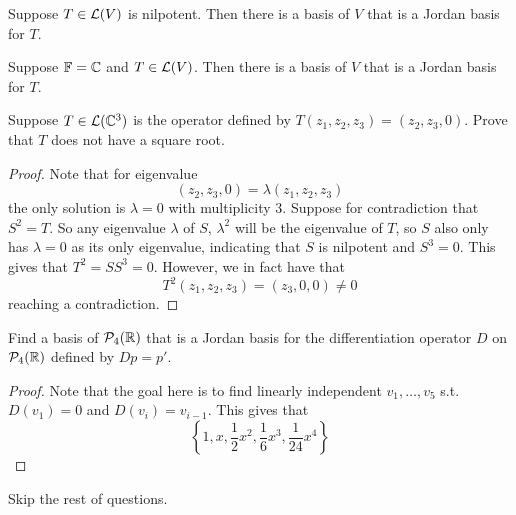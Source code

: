 \documentclass{extarticle}
\begin{document}
\begin{thm}
    Suppose \(T \in \mathcal{L}(V)\) is nilpotent. Then there is a basis of \(V\) that is a Jordan basis for \(T\).
\end{thm}


\begin{corollary}
    Suppose \(\mathbb{F} = \mathbb{C}\) and \(T \in \mathcal{L}(V)\). Then there is a basis of \(V\) that is a Jordan basis for 
    \(T\). 
\end{corollary}


\newpage 
{}

\begin{problem}{1}
    Suppose \(T \in \mathcal{L}(\mathbb{C}^3)\) is the operator defined by \(T(z_1, z_2, z_3) = (z_2, z_3, 0)\). Prove that 
    \(T\) does not have a square root. 
\end{problem}

\begin{proof}
Note that for eigenvalue 
\[(z_2, z_3, 0) = \lambda(z_1, z_2, z_3)\]
the only solution is \(\lambda = 0\) with multiplicity 3. Suppose for contradiction that \(S^2 = T\). So 
any eigenvalue \(\lambda\) of \(S\), \(\lambda^2\) will be the eigenvalue of \(T\), so \(S\) also only 
has \(\lambda=0\) as its only eigenvalue, indicating that \(S\) is nilpotent and \(S^3 = 0\). This gives 
that \(T^2 = SS^3 = 0\). However, we in fact have that 
\[T^2 (z_1, z_2, z_3) = (z_3, 0, 0) \neq 0\]
reaching a contradiction.
\end{proof}

\begin{problem}{6}
    Find a basis of \(\mathcal{P}_4 (\mathbb{R})\) that is a Jordan basis for the differentiation operator 
    \(D\) on \(\mathcal{P}_4(\mathbb{R})\) defined by \(D p = p'\).
\end{problem}

\begin{proof}
Note that the goal here is to find linearly independent \(v_1, \ldots, v_5\) s.t. \(D(v_1) = 0\) and 
\(D(v_{i}) = v_{i-1}\). This gives that 
\[\left\{1, x, \frac{1}{2}x^2, \frac{1}{6}x^3, \frac{1}{24}x^4\right\}\]
\end{proof}

Skip the rest of questions.
\end{document}
